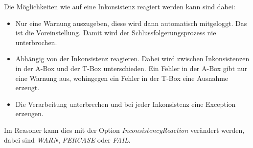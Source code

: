 Die Möglichkeiten wie auf eine Inkonsistenz reagiert werden kann sind dabei:
\begin{itemize}
  \item Nur eine Warnung auszugeben, diese wird dann automatisch mitgeloggt. Das ist die Voreinstellung. Damit wird der Schlussfolgerungsprozess nie unterbrochen.
  \item Abhängig von der Inkonsistenz reagieren. Dabei wird zwischen Inkonsistenzen in der A-Box und der T-Box unterschieden. Ein Fehler in der A-Box gibt nur eine Warnung aus, wohingegen ein Fehler in der T-Box eine Ausnahme erzeugt.
  \item Die Verarbeitung unterbrechen und bei jeder Inkonsistenz eine Exception erzeugen.
\end{itemize}

Im Reasoner kann dies mit der Option \emph{InconsistencyReaction} verändert werden, dabei sind \emph{WARN}, \emph{PERCASE} oder \emph{FAIL}.

